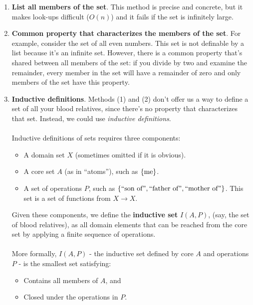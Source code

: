 \documentclass[]{article}
\DeclarePairedDelimiter{\set}{\lbrace}{\rbrace}
\theoremstyle{definition}
\begin{document}
        \begin{enumerate}
          \item \textbf{List all members of the set}. This method is precise and concrete, but it makes look-ups difficult ($O(n)$) and it fails if the set is infinitely large.
          \item \textbf{Common property that characterizes the members of the set}. For example, consider the set of all even numbers. This set is not definable by a list because it's an infinite set. However, there is a common property that's shared between all members of the set: if you divide by two and examine the remainder, every member in the set will have a remainder of zero and only members of the set have this property.
          \item \textbf{Inductive definitions}. Methods (1) and (2) don't offer us a way to define a set of all your blood relatives, since there's no property that characterizes that set. Instead, we could use \emph{inductive definitions}.
          \\ \\
          Inductive definitions of sets requires three components:
          \begin{itemize}
            \item A domain set $X$ (sometimes omitted if it is obvious).
            \item A core set $A$ (as in ``atoms''), such as $\set{ \text{me} }$.
            \item A set of operations $P$, such as $\set{ \text{``son of''}, \text{``father of''}, \text{``mother of''}}$. This set is a set of functions from $X \to X$.
          \end{itemize}

          Given these components, we define the \textbf{inductive set} $I(A, P)$, (say, the set of blood relatives), as all domain elements that can be reached from the core set by applying a finite sequence of operations.
          \\ \\
          More formally,  $I(A, P)$ - the inductive set defined by core $A$ and operations $P$ - is the smallest set satisfying:
          \begin{itemize}
            \item Contains all members of $A$, and
            \item Closed under the operations in $P$.
          \end{itemize}


\end{enumerate}
\end{document}
